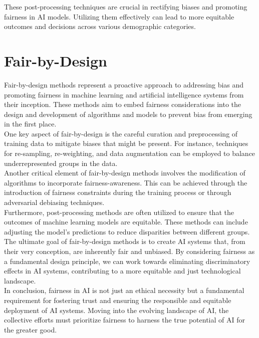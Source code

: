 \documentclass[12pt,a4paper,openright,twoside]{book}
\begin{document}
These post-processing techniques are crucial in rectifying biases and promoting fairness in AI models. Utilizing them effectively can lead to more equitable outcomes and decisions across various demographic categories.
\newpage
\section{Fair-by-Design}
Fair-by-design methods represent a proactive approach to addressing bias and promoting fairness in machine learning and artificial intelligence systems from their inception. These methods aim to embed fairness considerations into the design and development of algorithms and models to prevent bias from emerging in the first place. \\
One key aspect of fair-by-design is the careful curation and preprocessing of training data to mitigate biases that might be present. For instance, techniques for re-sampling, re-weighting, and data augmentation can be employed to balance underrepresented groups in the data. \\
Another critical element of fair-by-design methods involves the modification of algorithms to incorporate fairness-awareness. This can be achieved through the introduction of fairness constraints during the training process or through adversarial debiasing techniques. \\
Furthermore, post-processing methods are often utilized to ensure that the outcomes of machine learning models are equitable. These methods can include adjusting the model's predictions to reduce disparities between different groups. \\
The ultimate goal of fair-by-design methods is to create AI systems that, from their very conception, are inherently fair and unbiased. By considering fairness as a fundamental design principle, we can work towards eliminating discriminatory effects in AI systems, contributing to a more equitable and just technological landscape. \\


In conclusion, fairness in AI is not just an ethical necessity but a fundamental requirement for fostering trust and ensuring the responsible and equitable deployment of AI systems. Moving into the evolving landscape of AI, the collective efforts must prioritize fairness to harness the true potential of AI for the greater good.

%
\end{document}

